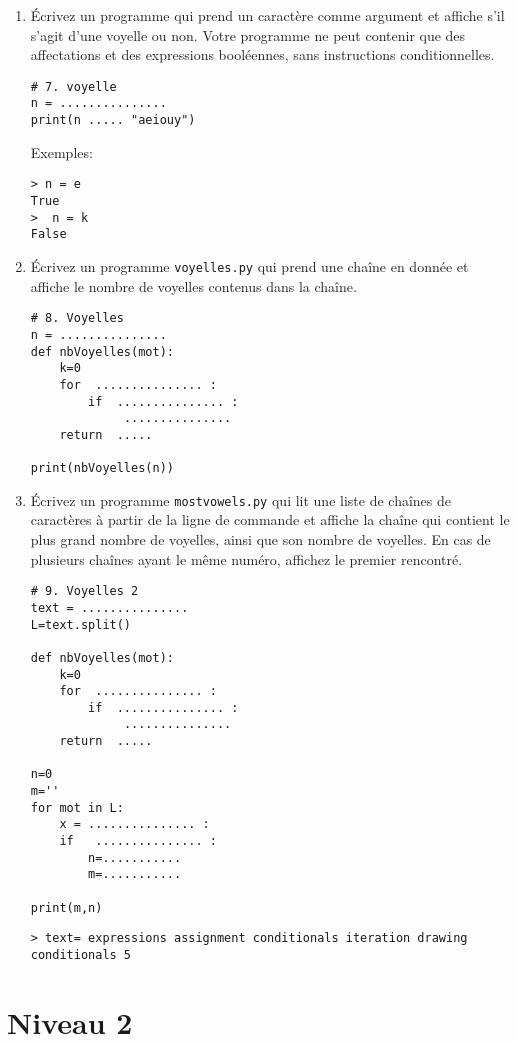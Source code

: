 \documentclass[a4paper]{article}
\begin{document}
\begin{enumerate}
\item Écrivez un programme qui prend un caractère comme argument et affiche s'il s'agit d'une voyelle ou non.
Votre programme ne peut contenir que des affectations et des expressions booléennes, sans instructions conditionnelles.
\begin{lstlisting}
# 7. voyelle
n = ...............
print(n ..... "aeiouy")
\end{lstlisting}
Exemples:
\begin{verbatim}
> n = e
True
>  n = k
False
\end{verbatim}

\item Écrivez un programme {\tt voyelles.py} qui prend une chaîne en donnée et affiche le nombre de voyelles contenus dans la chaîne.

\begin{lstlisting}
# 8. Voyelles
n = ...............
def nbVoyelles(mot):
    k=0
    for  ............... :
        if  ............... :
             ...............
    return  .....

print(nbVoyelles(n))
\end{lstlisting}

\item Écrivez un programme {\tt mostvowels.py} qui lit une liste de chaînes de caractères à partir de la ligne de commande et affiche la chaîne qui contient le plus grand nombre de voyelles, ainsi que son nombre de voyelles. En cas de plusieurs chaînes ayant le même numéro, affichez le premier rencontré.
\begin{lstlisting}
# 9. Voyelles 2
text = ...............
L=text.split()

def nbVoyelles(mot):
    k=0
    for  ............... :
        if  ............... :
             ...............
    return  .....

n=0
m=''
for mot in L:
    x = ............... :
    if   ............... :
        n=...........
        m=...........

print(m,n)
\end{lstlisting}

\begin{verbatim}
> text= expressions assignment conditionals iteration drawing
conditionals 5
\end{verbatim}


\end{enumerate}


\section{Niveau 2}
\end{document}
